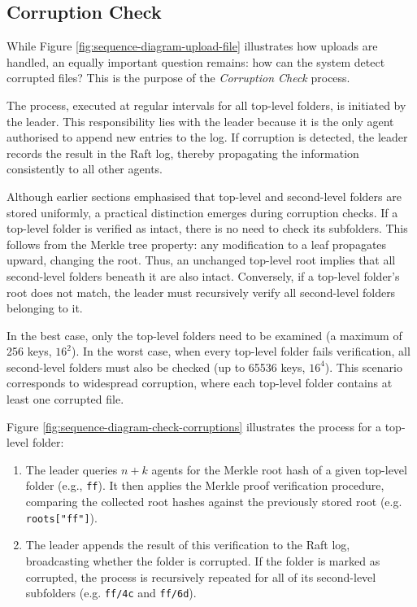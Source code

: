 \newpage
\subsection{Corruption Check} \label{sec:check-corruption}

While Figure \ref{fig:sequence-diagram-upload-file} illustrates how uploads are handled, an equally important question remains: how can the system detect corrupted files? This is the purpose of the \emph{Corruption Check} process.

The process, executed at regular intervals for all top-level folders, is initiated by the leader. This responsibility lies with the leader because it is the only agent authorised to append new entries to the log. If corruption is detected, the leader records the result in the Raft log, thereby propagating the information consistently to all other agents.

Although earlier sections emphasised that top-level and second-level folders are stored uniformly, a practical distinction emerges during corruption checks. If a top-level folder is verified as intact, there is no need to check its subfolders. This follows from the Merkle tree property: any modification to a leaf propagates upward, changing the root. Thus, an unchanged top-level root implies that all second-level folders beneath it are also intact. Conversely, if a top-level folder's root does not match, the leader must recursively verify all second-level folders belonging to it.

In the best case, only the top-level folders need to be examined (a maximum of 256 keys, $16^2$). In the worst case, when every top-level folder fails verification, all second-level folders must also be checked (up to 65536 keys, $16^4$). This scenario corresponds to widespread corruption, where each top-level folder contains at least one corrupted file.

Figure \ref{fig:sequence-diagram-check-corruptions} illustrates the process for a top-level folder:

\renewcommand{\labelenumi}{\textbf{(\theenumi)}}
\begin{enumerate}
    \item The leader queries $n+k$ agents for the Merkle root hash of a given top-level folder (e.g., \texttt{ff}). It then applies the Merkle proof verification procedure, comparing the collected root hashes against the previously stored root (e.g. \texttt{roots["ff"]}).
    \item The leader appends the result of this verification to the Raft log, broadcasting whether the folder is corrupted. If the folder is marked as corrupted, the process is recursively repeated for all of its second-level subfolders (e.g. \texttt{ff/4c} and \texttt{ff/6d}).
\end{enumerate}

